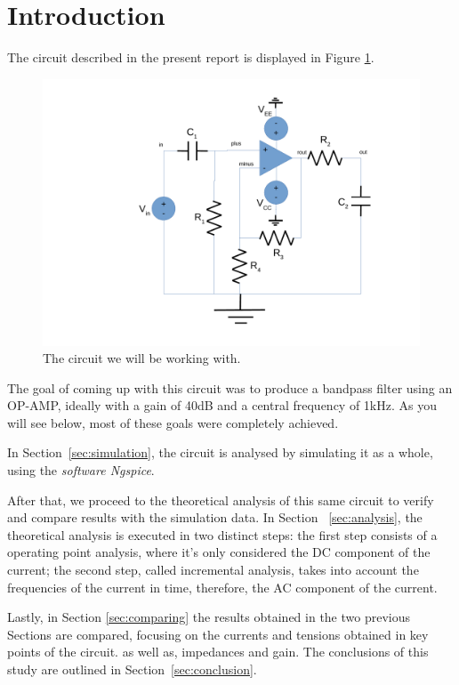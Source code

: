 \newpage
\section{Introduction}
\label{sec:introduction}



The circuit described in the present report is displayed in Figure \ref{fig:circuit}.

\begin{figure}[h] \centering
\includegraphics[width=0.7\linewidth]{circuit.pdf}
\caption{The circuit we will be working with.}
\label{fig:circuit}
\end{figure}

The goal of coming up with this circuit was to produce a bandpass filter using an OP-AMP, ideally with a gain of 40dB and a central frequency of 1kHz. As you will see below, most of these goals were completely achieved.

In Section~\ref{sec:simulation}, the circuit is analysed by simulating it as a whole, using the \textit{software Ngspice}.

After that, we proceed to the theoretical analysis of this same circuit to verify and compare results with the simulation data. In Section ~\ref{sec:analysis}, the theoretical analysis is executed in two distinct steps: the first step consists of a operating point analysis, where it's only considered the DC component of the current; the second step, called incremental analysis, takes into account the frequencies of the current in time, therefore, the AC component of the current.

Lastly, in Section \ref{sec:comparing} the results obtained in the two previous Sections are compared, focusing on the currents and tensions obtained in key points of the circuit. as well as, impedances and gain.
The conclusions of this study are outlined in Section~\ref{sec:conclusion}.